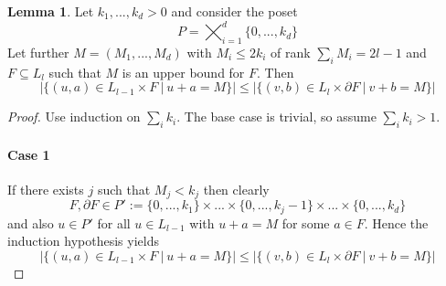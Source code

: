 \documentclass{scrartcl}
\theoremstyle{definition}
\newtheorem{lemma}[definition]{Lemma}
\begin{document}
\begin{lemma}
    Let $k_1, ..., k_d > 0$ and consider the poset
    \begin{equation*}
        P = \bigtimes_{i = 1}^d \{ 0, ..., k_d \}
    \end{equation*}
    Let further $M = (M_1, ..., M_d)$ with $M_i \leq 2k_i$ of rank $\sum_i M_i = 2l - 1$ and $F \subseteq L_l$ such that $M$ is an upper bound for $F$.
    Then
    \begin{equation*}
        |\{ (u, a) \in L_{l - 1} \times F \ | \ u + a = M \}| \leq |\{ (v, b) \in L_l \times \partial F \ | \ v + b = M \}|
    \end{equation*}
\end{lemma}
\begin{proof}
    Use induction on $\sum_i k_i$. 
    The base case is trivial, so assume $\sum_i k_i > 1$.

    \paragraph{Case 1} If there exists $j$ such that $M_j < k_j$ then clearly
    \begin{equation*}
        F, \partial F \in P' := \{ 0, ..., k_1 \} \times ... \times \{ 0, ..., k_j - 1 \} \times ... \times \{ 0, ..., k_d \}
    \end{equation*}
    and also $u \in P'$ for all $u \in L_{l - 1}$ with $u + a = M$ for some $a \in F$.
    Hence the induction hypothesis yields
    \begin{equation*}
        |\{ (u, a) \in L_{l - 1} \times F \ | \ u + a = M \}| \leq |\{ (v, b) \in L_l \times \partial F \ | \ v + b = M \}|
    \end{equation*}


\end{proof}
\end{document}
